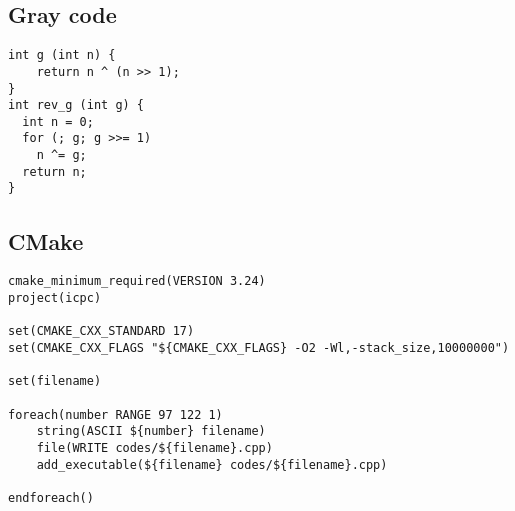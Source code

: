 \documentclass[landscape, 8pt, a4paper, oneside]{extarticle}
\begin{document}
\begin{multicols}{3}
\subsection{Gray code}
\begin{verbatim}
int g (int n) {
    return n ^ (n >> 1);
}
int rev_g (int g) {
  int n = 0;
  for (; g; g >>= 1)
    n ^= g;
  return n;
}
\end{verbatim}
\subsection{CMake}
\begin{verbatim}
cmake_minimum_required(VERSION 3.24)
project(icpc)

set(CMAKE_CXX_STANDARD 17)
set(CMAKE_CXX_FLAGS "${CMAKE_CXX_FLAGS} -O2 -Wl,-stack_size,10000000")

set(filename)

foreach(number RANGE 97 122 1)
    string(ASCII ${number} filename)
    file(WRITE codes/${filename}.cpp)
    add_executable(${filename} codes/${filename}.cpp)

endforeach()
\end{verbatim}
\end{multicols}
\end{document}
